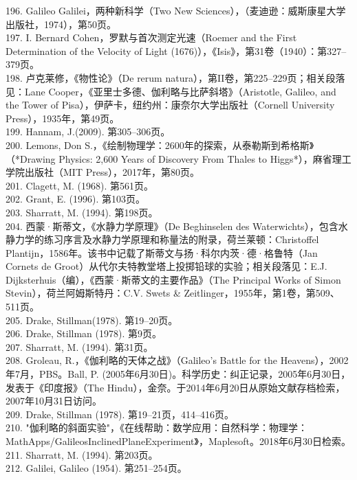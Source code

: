 196. Galileo Galilei，两种新科学（Two New Sciences），（麦迪逊：威斯康星大学出版社，1974），第50页。\\
197. I. Bernard Cohen，罗默与首次测定光速（Roemer and the First Determination of the Velocity of Light (1676)），《Isis》，第31卷（1940）：第327–379页。\\
198. 卢克莱修，《物性论》（De rerum natura），第II卷，第225–229页；相关段落见：Lane Cooper，《亚里士多德、伽利略与比萨斜塔》（Aristotle, Galileo, and the Tower of Pisa），伊萨卡，纽约州：康奈尔大学出版社（Cornell University Press），1935年，第49页。\\
199. Hannam, J.(2009). 第305–306页。\\
200. Lemons, Don S.，《绘制物理学：2600年的探索，从泰勒斯到希格斯》（*Drawing Physics: 2,600 Years of Discovery From Thales to Higgs*），麻省理工学院出版社（MIT Press），2017年，第80页。\\
201. Clagett, M. (1968). 第561页。\\
202. Grant, E. (1996). 第103页。\\
203. Sharratt, M. (1994). 第198页。\\
204. 西蒙·斯蒂文，《水静力学原理》（De Beghinselen des Waterwichts），包含水静力学的练习序言及水静力学原理和称量法的附录，荷兰莱顿：Christoffel Plantijn，1586年。该书中记载了斯蒂文与扬·科尔内茨·德·格鲁特（Jan Cornets de Groot）从代尔夫特教堂塔上投掷铅球的实验；相关段落见：E.J. Dijksterhuis（编），《西蒙·斯蒂文的主要作品》（The Principal Works of Simon Stevin），荷兰阿姆斯特丹：C.V. Swets & Zeitlinger，1955年，第1卷，第509、511页。\\
205. Drake, Stillman(1978). 第19–20页。\\
206. Drake, Stillman (1978). 第9页。\\
207. Sharratt, M. (1994). 第31页。\\
208. Groleau, R.，《伽利略的天体之战》（Galileo's Battle for the Heavens），2002年7月，PBS。Ball, P. (2005年6月30日)。科学历史：纠正记录，2005年6月30日，发表于《印度报》（The Hindu），金奈。于2014年6月20日从原始文献存档检索，2007年10月31日访问。\\
209. Drake, Stillman (1978). 第19–21页，414–416页。\\
210. "伽利略的斜面实验"，《在线帮助：数学应用：自然科学：物理学：MathApps/GalileosInclinedPlaneExperiment》，Maplesoft。2018年6月30日检索。\\
211. Sharratt, M. (1994). 第203页。\\
212. Galilei, Galileo (1954). 第251–254页。\\
